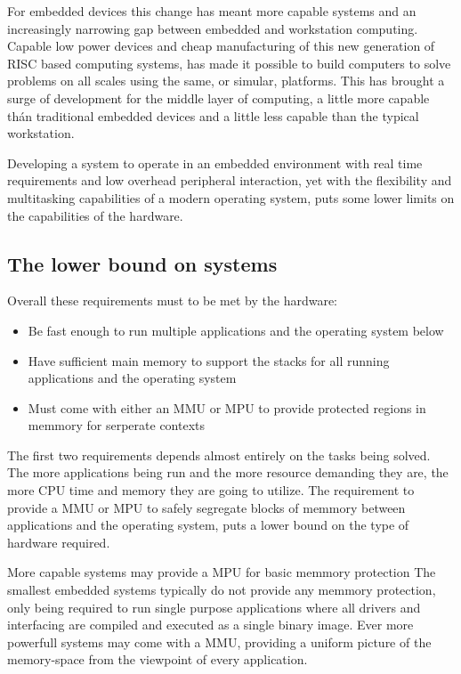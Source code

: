 For embedded devices this change has meant more capable systems
and an increasingly narrowing gap between embedded and workstation computing.
Capable low power devices and cheap manufacturing of this new generation of RISC based computing systems,
has made it possible to build computers to solve problems on all scales using the same, or simular, platforms.
This has brought a surge of development for the middle layer of computing,
a little more capable thán traditional embedded devices and a little less capable than the typical workstation.

Developing a system to operate in an embedded environment with real time requirements
and low overhead peripheral interaction,
yet with the flexibility and multitasking capabilities of a modern operating system,
puts some lower limits on the capabilities of the hardware.

\subsection{The lower bound on systems}
Overall these requirements must to be met by the hardware:
\begin{itemize}
	\item Be fast enough to run multiple applications and the operating system below
	\item Have sufficient main memory to support the stacks for all running applications and the operating system
	\item Must come with either an MMU or MPU to provide protected regions in memmory for serperate contexts
\end{itemize}

The first two requirements depends almost entirely on the tasks being solved.
The more applications being run and the more resource demanding they are,
the more CPU time and memory they are going to utilize.
The requirement to provide a MMU or MPU to safely segregate blocks of memmory between applications and the operating system,
puts a lower bound on the type of hardware required.

More capable systems may provide a MPU for basic memmory protection
The smallest embedded systems typically do not provide any memmory protection,
only being required to run single purpose applications where all drivers and interfacing
are compiled and executed as a single binary image.
Ever more powerfull systems may come with a MMU,
providing a uniform picture of the memory-space from the viewpoint of every application.

